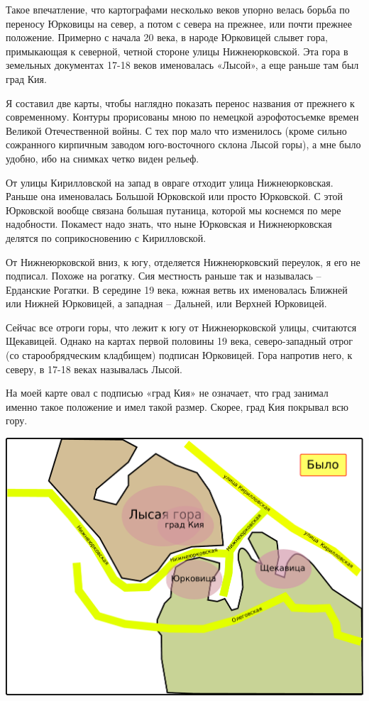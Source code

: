 Такое впечатление, что картографами несколько веков упорно велась борьба по переносу Юрковицы на север, а потом с севера на прежнее, или почти прежнее положение. Примерно с начала 20 века, в народе Юрковицей слывет гора, примыкающая к северной, четной стороне улицы Нижнеюрковской. Эта гора в земельных документах 17-18 веков именовалась «Лысой», а еще раньше там был град Кия.

Я составил две карты, чтобы наглядно показать перенос названия от прежнего к современному. Контуры прорисованы мною по немецкой аэрофотосъемке времен Великой Отечественной войны. С тех пор мало что изменилось (кроме сильно сожранного кирпичным заводом юго-восточного склона Лысой горы), а мне было удобно, ибо на снимках четко виден рельеф. 

От улицы Кирилловской на запад в овраге отходит улица Нижнеюрковская. Раньше она именовалась Большой Юрковской или просто Юрковской. С этой Юрковской вообще связана большая путаница, которой мы коснемся по мере надобности. Покамест надо знать, что ныне Юрковская и Нижнеюрковская делятся по соприкосновению с Кирилловской.

От Нижнеюрковской вниз, к югу, отделяется Нижнеюрковский переулок, я его не подписал. Похоже на рогатку. Сия местность раньше так и называлась – Ерданские Рогатки. В середине 19 века, южная ветвь их именовалась Ближней или Нижней Юрковицей, а западная – Дальней, или Верхней Юрковицей.

Сейчас все отроги горы, что лежит к югу от Нижнеюрковской улицы, считаются Щекавицей. Однако на картах первой половины 19 века, северо-западный отрог (со старообрядческим кладбищем) подписан Юрковицей. Гора напротив него, к северу, в 17-18 веках называлась Лысой. 

На моей карте овал с подписью «град Кия» не означает, что град занимал именно такое положение и имел такой размер. Скорее, град Кия покрывал всю гору.

\begin{center}
\includegraphics[width=0.90\linewidth]{chast-kirvys/poisk-yourk/yourk-bylo.pdf}
\end{center} 

